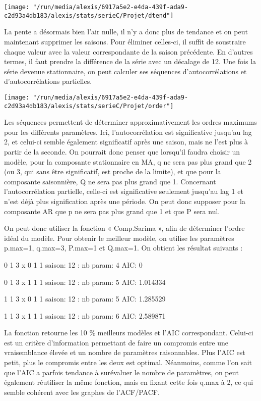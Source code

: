\documentclass[11pt,a4paper]{article}
\begin{document}
\begin{center}
\texttt{[image: "/run/media/alexis/6917a5e2-e4da-439f-ada9-c2d93a4db183/alexis/stats/serieC/Projet/dtend"]}
\end{center}

La pente a désormais bien l'air nulle, il n'y a donc plus de tendance et on peut maintenant supprimer les saisons. Pour éliminer celles-ci, il suffit de soustraire chaque valeur avec la valeur correspondante de la saison précédente. En d'autres termes, il faut prendre la différence de la série avec un décalage de 12. Une fois la série devenue stationnaire, on peut calculer ses séquences d'autocorrélations et d'autocorrélations partielles.

\begin{center}
\texttt{[image: "/run/media/alexis/6917a5e2-e4da-439f-ada9-c2d93a4db183/alexis/stats/serieC/Projet/order"]}
\end{center}

Les séquences permettent de déterminer approximativement les ordres maximums pour les différents paramètres. Ici, l'autocorrélation est significative jusqu'au lag 2, et celui-ci semble également significatif après une saison, mais ne l'est plus à partir de la seconde. On pourrait donc penser que lorsqu'il faudra choisir un modèle, pour la composante stationnaire en MA, q ne sera pas plus grand que 2 (ou 3, qui sans être significatif, est proche de la limite), et que pour la composante saisonnière, Q ne sera pas plus grand que 1. Concernant l'autocorrélation partielle, celle-ci est significative seulement jusqu'au lag 1 et n'est déjà plus signification après une période. On peut donc supposer pour la composante AR que p ne sera pas plus grand que 1 et que P sera nul. \bigskip

On peut donc utiliser la fonction « Comp.Sarima », afin de déterminer l'ordre idéal du modèle. Pour obtenir le meilleur modèle, on utilise les paramètres p.max=1, q.max=3, P.max=1 et Q.max=1. On obtient les résultat suivants : \bigskip

0 1 3 x 0 1 1 saison: 12 :  nb param:  4 AIC: 0  

0 1 3 x 1 1 1 saison:  12 :  nb param:  5 AIC: 1.014334 

1 1 3 x 0 1 1 saison:  12 :  nb param:  5 AIC: 1.285529 

1 1 3 x 1 1 1 saison:  12 :  nb param:  6 AIC: 2.589871 
\bigskip

La fonction retourne les 10 \% meilleurs modèles et l'AIC correspondant. Celui-ci est un critère d'information permettant de faire un compromis entre une vraisemblance élevée et un nombre de paramètres raisonnables. Plus l'AIC est petit, plus le compromis entre les deux est optimal. Néanmoins, comme l'on sait que l'AIC a parfois tendance à surévaluer le nombre de paramètres, on peut également réutiliser la même fonction, mais en fixant cette fois q.max à 2, ce qui semble cohérent avec les graphes de l'ACF/PACF.\bigskip
\end{document}

